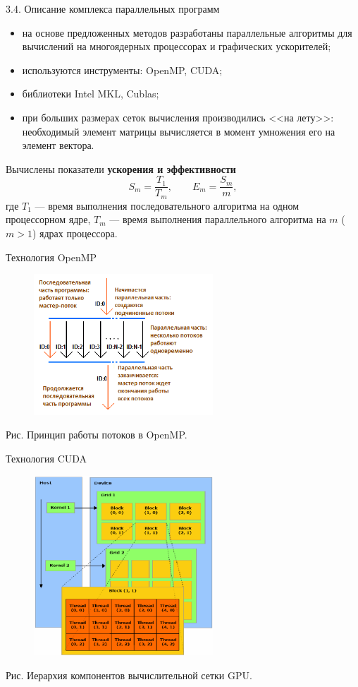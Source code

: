 \documentclass[10pt,pdf, mathserif, hyperref={unicode}]{beamer}
\begin{document}
\begin{frame}{3.4. Описание комплекса параллельных программ}
	\begin{itemize}
		\item на основе предложенных методов разработаны параллельные алгоритмы для вычислений на многоядерных процессорах и графических ускорителей;
		\item используются инструменты: OpenMP, CUDA;
		\item библиотеки Intel MKL, Cublas;
		\item при больших размерах сеток вычисления производились <<на лету>>: необходимый элемент матрицы вычисляется в момент умножения его на элемент вектора.
	\end{itemize}
	
	Вычислены показатели {\textbf{ускорения и эффективности}}
	$$
	S_m=\frac{T_1}{T_m},\quad
	\quad E_m=\frac{S_m}{m}, $$
	где $T_1$ --- время выполнения последовательного алгоритма на одном
	процессорном ядре,
	$T_m$ --- время выполнения параллельного алгоритма на $m$ ($m>1$) ядрах процессора.
\end{frame}
\begin{frame}{Технология OpenMP}
	\begin{figure}[h]
		\centering
		\includegraphics[width=0.6\textwidth]{omp}
	\end{figure}
	\centering
	Рис. Принцип работы потоков в OpenMP.
\end{frame}
\begin{frame}{Технология CUDA}
	\begin{figure}[h]
		\centering
		\includegraphics[width=0.6\textwidth]{cuda}
	\end{figure}
	\centering
	Рис. Иерархия компонентов вычислительной сетки GPU.
\end{frame}
\end{document}
